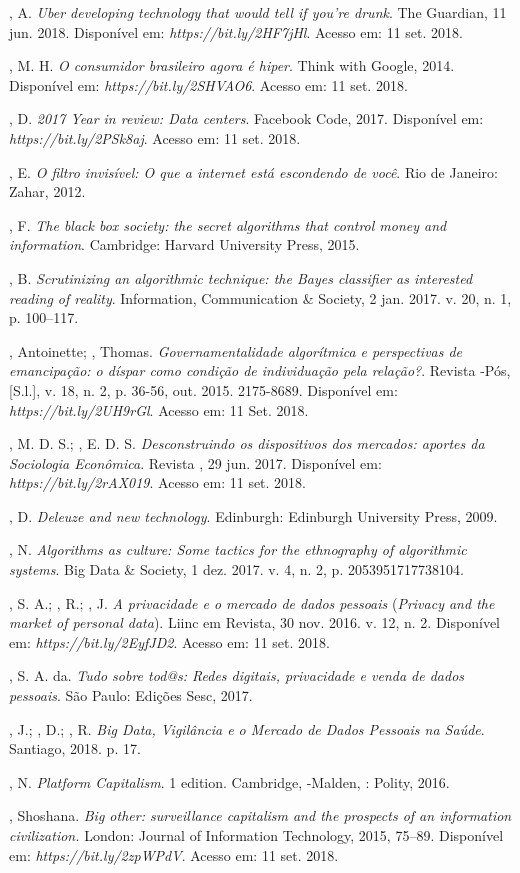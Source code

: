 , A. \emph{Uber developing technology that would tell if you're
drunk}. The Guardian, 11 jun. 2018. Disponível em: \emph{https://bit.ly/2HF7jHl}.
Acesso em: 11 set. 2018.

, M. H. \emph{O consumidor brasileiro agora é hiper}. Think
with Google, 2014. Disponível em: \emph{https://bit.ly/2SHVAO6}.
Acesso em: 11 set. 2018.

, D. \emph{2017 Year in review: Data centers}. Facebook Code,
2017. Disponível em: \emph{https://bit.ly/2PSk8aj}. Acesso em: 11 set. 2018.

, E. \emph{O filtro invisível: O que a internet está escondendo
de você}. Rio de Janeiro: Zahar, 2012.

, F. \emph{The black box society: the secret algorithms that
control money and information}. Cambridge: Harvard University Press,
2015.

, B. \emph{Scrutinizing an algorithmic technique: the Bayes
classifier as interested reading of reality}. Information, Communication
\& Society, 2 jan. 2017. v. 20, n. 1, p. 100--117.

, Antoinette; , Thomas. \emph{Governamentalidade
algorítmica e perspectivas de emancipação: o díspar como condição de
individuação pela relação?}. Revista -Pós, [S.l.], v. 18, n. 2, p.
36-56, out. 2015.  2175-8689. Disponível em:
\emph{https://bit.ly/2UH9rGl}. Acesso em: 11 Set. 2018.

, M. D. S.; , E. D. S. \emph{Desconstruindo os
dispositivos dos mercados: aportes da Sociologia Econômica}. Revista
, 29 jun. 2017. Disponível em: \emph{https://bit.ly/2rAX019}. Acesso em: 11 set. 2018.

, D. \emph{Deleuze and new technology}. Edinburgh: Edinburgh
University Press, 2009.

, N. \emph{Algorithms as culture: Some tactics for the
ethnography of algorithmic systems}. Big Data \& Society, 1 dez. 2017. v.
4, n. 2, p. 2053951717738104.

, S. A.; , R.; , J. \emph{A privacidade e o
mercado de dados pessoais} (\emph{Privacy and the market of personal
data}). Liinc em Revista, 30 nov. 2016. v. 12, n. 2. Disponível em:
\emph{https://bit.ly/2EyfJD2}. Acesso em: 11 set. 2018.

, S. A. da. \emph{Tudo sobre tod@s: Redes digitais,
privacidade e venda de dados pessoais}. São Paulo: Edições Sesc, 2017.

, J.; , D.; , R. \emph{Big Data, Vigilância e o
Mercado de Dados Pessoais na Saúde}. Santiago, 2018. p. 17.

, N. \emph{Platform Capitalism}. 1 edition. Cambridge, -Malden,
: Polity, 2016.

, Shoshana. \emph{Big other: surveillance capitalism and the
prospects of an information civilization.} London: Journal of
Information Technology, 2015, 75--89. Disponível em: \emph{https://bit.ly/2zpWPdV}. Acesso em: 11 set. 2018.

